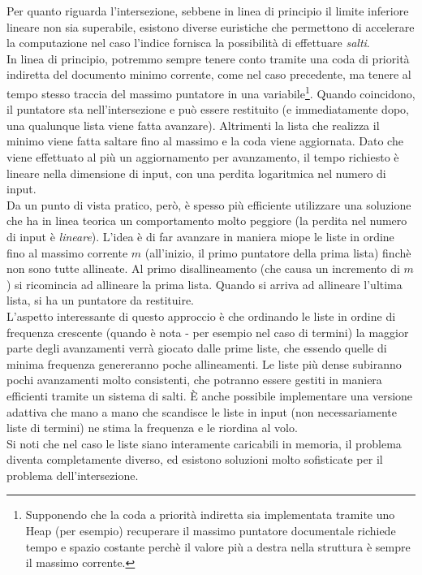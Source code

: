 Per quanto riguarda l'intersezione, sebbene in linea di principio il limite inferiore lineare non sia superabile, esistono diverse euristiche che permettono di accelerare la computazione nel caso l'indice fornisca la possibilità di effettuare \textit{salti}.\\
In linea di principio, potremmo sempre tenere conto tramite una coda di priorità indiretta del documento minimo corrente, come nel caso precedente, ma tenere al tempo stesso traccia del massimo puntatore in una variabile\footnote{Supponendo che la coda a priorità indiretta sia implementata tramite uno Heap (per esempio) recuperare il massimo puntatore documentale richiede tempo e spazio costante perchè il valore più a destra nella struttura è sempre il massimo corrente.}. Quando coincidono, il puntatore sta nell'intersezione e può essere restituito (e immediatamente dopo, una qualunque lista viene fatta avanzare). Altrimenti la lista che realizza il minimo viene fatta saltare fino al massimo e la coda viene aggiornata. Dato che viene effettuato al più un aggiornamento per avanzamento, il tempo richiesto è lineare nella dimensione di input, con una perdita logaritmica nel numero di input.\\
Da un punto di vista pratico, però, è spesso più efficiente utilizzare una soluzione che ha in linea teorica un comportamento molto peggiore (la perdita nel numero di input è \textit{lineare}). L'idea è di far avanzare in maniera miope le liste in ordine fino al massimo corrente $m$ (all'inizio, il primo puntatore della prima lista) finchè non sono tutte allineate. Al primo disallineamento (che causa un incremento di $m$) si ricomincia ad allineare la prima lista. Quando si arriva ad allineare l'ultima lista, si ha un puntatore da restituire.\\
L'aspetto interessante di questo approccio è che ordinando le liste in ordine di frequenza crescente (quando è nota - per esempio nel caso di termini) la maggior parte degli avanzamenti verrà giocato dalle prime liste, che essendo quelle di minima frequenza genereranno poche allineamenti. Le liste più dense subiranno pochi avanzamenti molto consistenti, che potranno essere gestiti in maniera efficienti tramite un sistema di salti. È anche possibile implementare una versione adattiva che mano a mano che scandisce le liste in input (non necessariamente liste di termini) ne stima la frequenza e le riordina al volo.\\
Si noti che nel caso le liste siano interamente caricabili in memoria, il problema diventa completamente diverso, ed esistono soluzioni molto sofisticate per il problema dell'intersezione. %
